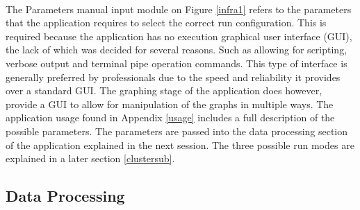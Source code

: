 \paragraph{}The Parameters manual input module on Figure \ref{infra1} refers to the parameters that the application requires to select the correct run configuration. This is required because the application has no execution graphical user interface (GUI), the lack of which was decided for several reasons. Such as allowing for scripting, verbose output and terminal pipe operation commands. This type of interface is generally preferred by professionals due to the speed and reliability it provides over a standard GUI. The graphing stage of the application does however, provide a GUI to allow for manipulation of the graphs in multiple ways. The application usage found in Appendix \ref{usage} includes a full description of the possible parameters. The parameters are passed into the data processing section of the application explained in the next session. The three possible run modes are explained in a later section \ref{clustersub}.

\subsection{Data Processing}
\label{infra2}

